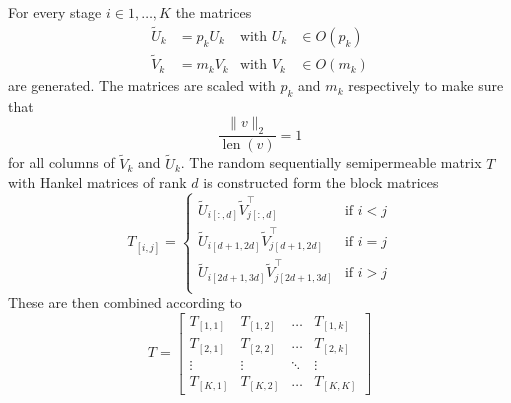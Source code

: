 \documentclass[doctype=mastersthesis,BCOR=15mm,biblatex]{ldvbook}%
\DeclareMathOperator{\length}{len}
\begin{document}
For every stage $i \in 1, \dots ,K$ the matrices 
\begin{align}
	\tilde{U}_k &=p_k U_k  & \text{with } U_k &\in O(p_k)\\
	\tilde{V}_k &=m_k V_k  & \text{with } V_k &\in O(m_k)
\end{align}
are generated.
The matrices are scaled with $p_k$ and $m_k$ respectively to make sure that 
\begin{equation}
	\frac{\|v\|_2}{\length(v)} = 1  
\end{equation}
for all columns of $\tilde{V}_k$ and $\tilde{U}_k$.
The random sequentially semipermeable matrix $T$ with Hankel matrices of rank $d$ is constructed form the block matrices 
\begin{equation}
	T_{[i,j]} = 
	\begin{cases}
	\tilde{U}_{i[:,d]} \tilde{V}_{j[:,d]}^\top & \text{if } i<j\\
	\tilde{U}_{i[d+1,2d]} \tilde{V}_{j[d+1,2d]}^\top & \text{if } i=j\\
	\tilde{U}_{i[2d+1,3d]} \tilde{V}_{j[2d+1,3d]}^\top & \text{if } i>j\\
	\end{cases}
\end{equation}
These are then combined according to 
\begin{equation}
	T = \begin{bmatrix}
	T_{[1,1]} & T_{[1,2]} & \dots & T_{[1,k]}\\
	T_{[2,1]} & T_{[2,2]} & \dots & T_{[2,k]}\\
	\vdots & \vdots & \ddots &\vdots\\
	T_{[K,1]} & T_{[K,2]} & \dots & T_{[K,K]}
	\end{bmatrix}
\end{equation}

\printbibliography{}
\end{document}

